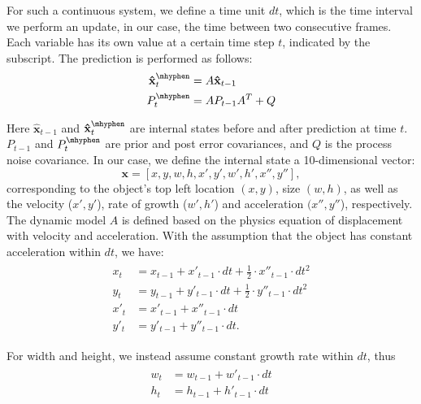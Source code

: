 For such a continuous system, we define a time unit $dt$, which is the time interval we perform an update, in our case, the time between two consecutive frames. Each variable has its own value at a certain time step $t$, indicated by the subscript. The prediction is performed as follows: 
\begin{align}
\begin{split}
\mathbf{\hat{x}}^{\mhyphen}_t & = A\mathbf{\hat{x}}_{t-1}\\
P^\mhyphen_t & = AP_{t-1}A^T + Q 
\end{split}
\label{eq:kf-predict}
\end{align}

Here $\mathbf{\hat{x}}_{t-1}$ and $\mathbf{\hat{x}}^{\mhyphen}_t$ are internal states before and after prediction at time $t$. $P_{t-1}$ and $P^\mhyphen_t$ are prior and post error covariances, and $Q$ is the process noise covariance. In our case, we define 
the internal state a 10-dimensional vector: $$\mathbf{x}=[x, y, w, h, x', y', w', h', x'', y''],$$ corresponding to the object's top left location $(x, y)$, size $(w, h)$, as well as the velocity ($x',y'$), rate of growth ($w',h'$) and acceleration $(x'', y''$), respectively.
The dynamic model $A$ is defined based on the physics equation of displacement with velocity and acceleration. With the assumption that the object has constant acceleration within $dt$, we have:
\begin{align}
\begin{split}
  x_t & = x_{t-1} + x'_{t-1}\cdot dt+\tfrac{1}{2}\cdot x''_{t-1}\cdot dt^2\\
  y_t & = y_{t-1} + y'_{t-1}\cdot dt+\tfrac{1}{2}\cdot y''_{t-1}\cdot dt^2\\
  x'_t & = x'_{t-1} + x''_{t-1}\cdot dt\\
  y'_t & = y'_{t-1} + y''_{t-1}\cdot dt.
\end{split}
\label{eq:motion-model-r}
\end{align}

For width and height, we instead assume constant growth rate within $dt$, thus
\begin{align}
\begin{split}
  w_t & = w_{t-1} + w'_{t-1}\cdot dt\\
  h_t & = h_{t-1} + h'_{t-1}\cdot dt
\end{split}
\label{eq:motion-model-v}
\end{align} 

